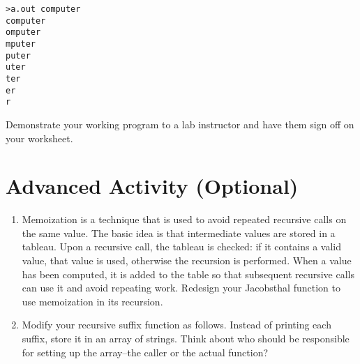 \documentclass[12pt]{scrartcl}
\begin{document}
\begin{verbatim}
>a.out computer
computer
omputer
mputer
puter
uter
ter
er
r
\end{verbatim}

Demonstrate your working program to a lab instructor and have them 
sign off on your worksheet.

\section{Advanced Activity (Optional)}

\begin{enumerate}
  \item Memoization is a technique that is used to avoid repeated 
  	recursive calls on the same value.  The basic idea is that intermediate 
	values are stored in a tableau.  Upon a recursive call, the tableau is 
	checked: if it contains a valid value, that value is used, otherwise the 
	recursion is performed.  When a value has been computed, it is added 
	to the table so that subsequent recursive calls can use it and avoid 
	repeating work.  Redesign your Jacobsthal function to use memoization 
	in its recursion.
  \item Modify your recursive suffix function as follows.  Instead of printing 
	each suffix, store it in an array of strings.  Think about who should be 
	responsible for setting up the array--the caller or the actual function? 
\end{enumerate}
	
\end{document}
